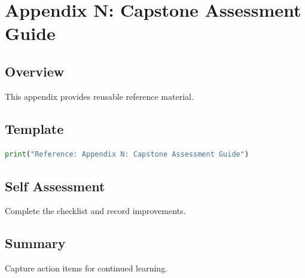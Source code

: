 \chapter{Appendix N: Capstone Assessment Guide}
\label{chap:vol16-4}



\section{Overview}
This appendix provides reusable reference material.

\section{Template}
\begin{lstlisting}[language=Python]
print("Reference: Appendix N: Capstone Assessment Guide")
\end{lstlisting}

\section{Self Assessment}
\begin{exercise}
Complete the checklist and record improvements.
\end{exercise}

\section{Summary}
Capture action items for continued learning.
